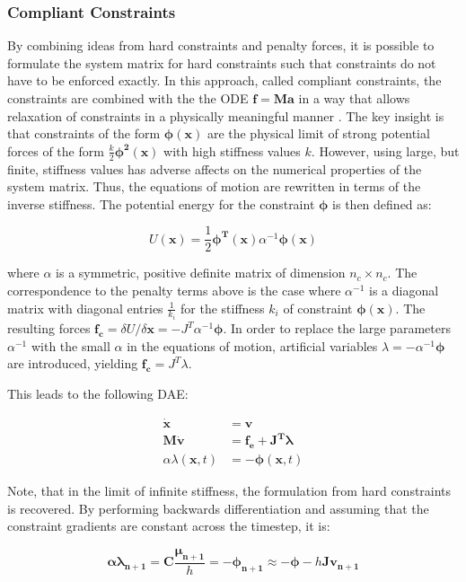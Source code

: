 \documentclass{article}
\begin{document}
\subsubsection*{Compliant Constraints}
By combining ideas from hard constraints and penalty forces, it is possible to formulate the system matrix for hard constraints such that
constraints do not have to be enforced exactly. In this approach, called compliant constraints, the constraints are combined with the the ODE
$\bm{f} = \bm{Ma}$ in a way that allows relaxation of constraints in a physically meaningful manner \cite{servin2006}. The key insight is that
constraints of the form $\bm{\phi(x)}$ are the physical limit of strong potential forces of the form $\frac{k}{2}\bm{\phi^2(x)}$ with high 
stiffness values $k$. However, using large, but finite, stiffness values has adverse affects on the numerical properties of the system matrix. 
Thus, the equations of motion are rewritten in terms of the inverse stiffness. The potential energy for the constraint $\bm{\phi}$ is then 
defined as:

\[
    U(\bm{x}) = \frac{1}{2}\bm{\phi^T(x)} \alpha^{-1}\bm{\phi(x)}
\]

where $\alpha$ is a symmetric, positive definite matrix of dimension $n_c \times n_c$. The correspondence to the penalty terms above is the 
case where $\alpha^{-1}$ is a diagonal matrix with diagonal entries $\frac{1}{k_i}$ for the stiffness $k_i$ of constraint $\bm{\phi(x)}$. The
resulting forces $\bm{f_c} = \delta U / \delta \bm{x} = -J^T\alpha^{-1} \bm{\phi}$. In order to replace the large parameters $\alpha^{-1}$ with
the small $\alpha$ in the equations of motion, artificial variables $\lambda = -\alpha^{-1}\bm{\phi}$ are introduced, yielding 
$\bm{f_c} = J^T\lambda$.

This leads to the following DAE:

\begin{align*}
    \bm{\dot{x}} &= \bm{v} \\
    \bm{M\dot{v}} &= \bm{f_{e} + J^T\lambda} \\
    \alpha\lambda(\bm{x}, t) &= -\bm{\phi}(\bm{x}, t)
\end{align*}

Note, that in the limit of infinite stiffness, the formulation from hard constraints is recovered. By performing backwards differentiation and 
assuming that the constraint gradients are constant across the timestep, it is:

\[
    \bm{\alpha\lambda_{n+1}} = \bm{C}\frac{\bm{\mu_{n+1}}}{h} = -\bm{\phi_{n+1}} \approx -\bm{\phi} - h\bm{Jv_{n+1}}
\]
\end{document}
